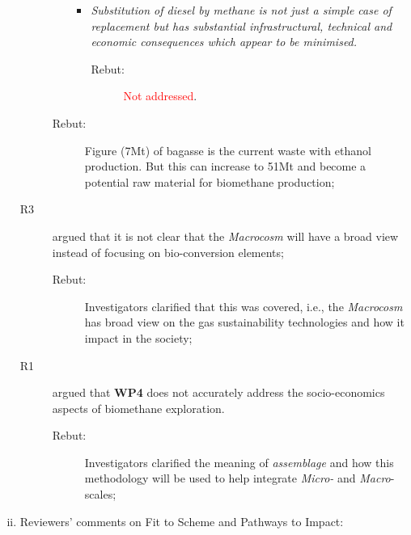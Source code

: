 \documentclass[14pt,twoside]{report}
\begin{document}
\begin{enumerate}[(i)]
\begin{description}
\begin{enumerate}
\begin{itemize}
\begin{description}
                          \end{description}
                       \item {\it Substitution of diesel by methane is not just a simple case of replacement but has substantial infrastructural, technical and economic consequences which appear to be minimised.}
                          \begin{description}
                            \item[Rebut:] \textcolor{red}{Not addressed}.
                          \end{description}
                   \end{itemize}
            \end{enumerate}
            \begin{description}
               \item[Rebut:] Figure (7Mt) of bagasse is the current waste with ethanol production. But this can increase to 51Mt and become a potential raw material for biomethane production; 
            \end{description}
          \item[R3] argued that it is not clear that the {\it Macrocosm} will have a broad view instead of focusing on bio-conversion elements;
            \begin{description}
               \item[Rebut:] Investigators clarified that this was covered, i.e., the {\it Macrocosm} has broad view on the gas sustainability technologies and how it impact in the society;
            \end{description}
          \item[R1] argued that {\bf WP4} does not accurately address the socio-economics aspects of biomethane exploration.
            \begin{description}
               \item[Rebut:] Investigators clarified the meaning of {\it assemblage} and how this methodology will be used to help integrate {\it Micro-} and {\it Macro}-scales;
            \end{description}
%          
       \end{description}
%
     \item Reviewers' comments on Fit to Scheme and Pathways to Impact:
%


\end{enumerate}
\end{document}
